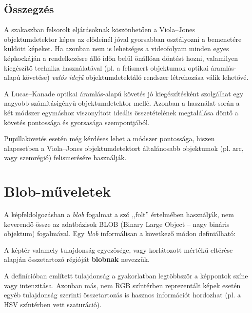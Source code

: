 \subsection{Összegzés}\label{sect:detect_osszefoglalas}

A  szakaszban felsorolt eljárásoknak köszönhetően a Viola--Jones objektumdetektor képes az elődeinél jóval gyorsabban osztályozni a bemenetére küldött képeket. Ha azonban nem is lehetséges a videofolyam minden egyes képkockáján a rendelkezésre álló időn belül önállóan döntést hozni, valamilyen kiegészítő technika használatával (pl. a felismert objektumok optikai áramlás-alapú követése) \emph{valós idejű} objektumdetektáló rendszer létrehozása válik lehetővé.

A Lucas--Kanade optikai áramlás-alapú követés jó kiegészítésként szolgálhat egy nagyobb számításigényű objektumdetektor mellé. Azonban a használat során a két módszer egymáshoz viszonyított ideális összetételének megtalálása döntő a követés pontossága és gyorsasága szempontjából.

Pupillakövetés esetén még kérdéses lehet a módszer pontossága, hiszen alapesetben a Viola--Jones objektumdetektort általánosabb objektumok (pl. arc, vagy szemrégió) felismerésére használják.



\newpage
\section{Blob-műveletek}\label{sect:blob}

A képfeldolgozásban a \emph{blob} fogalmat a szó ,,folt'' értelmében használják, nem keverendő össze az adatbázisok BLOB (Binary Large Object -- nagy bináris objektum) fogalmával. Egy \emph{blob} informálisan a következő módon definiálható:

\begin{definition}
A képtér valamely tulajdonság egyezősége, vagy korlátozott mértékű eltérése alapján összetartozó régióját \textbf{blobnak} nevezzük.
\end{definition}

A definícióban említett tulajdonság a gyakorlatban legtöbbször a képpontok színe vagy intenzitása. Azonban más, nem RGB színtérben reprezentált képek esetén egyéb tulajdonság szerinti összetartozás is hasznos információt hordozhat (pl. a HSV színtérben vett szaturáció).

